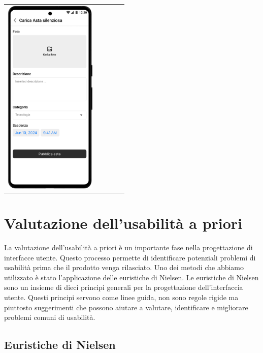 \begin{center}
\begin{tabular}{ccccc}
		\includegraphics[height=270pt]{assets/mockup/Carica Asta 1.1 Asta Silenziosa.png}       \\
	\end{tabular}
\end{center}





\newpage

\section{Valutazione dell'usabilità a priori}
La valutazione dell'usabilità a priori è un importante fase nella progettazione di interfacce utente. Questo processo permette di identificare potenziali problemi di usabilità prima che il prodotto venga rilasciato.\meskip
Uno dei metodi che abbiamo utilizzato è stato l'applicazione delle euristiche di Nielsen.\sskip
Le euristiche di Nielsen sono un insieme di dieci principi generali per la progettazione dell'interfaccia utente. Questi principi servono come linee guida, non sono regole rigide ma piuttosto suggerimenti che possono aiutare a valutare, identificare e migliorare problemi comuni di usabilità.

\subsection{Euristiche di Nielsen}

